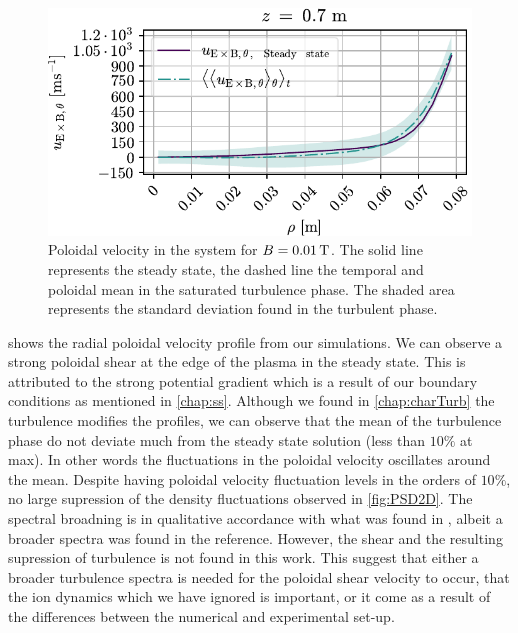 %
\begin{figure}[htbp]
    \centering
    \includegraphics{fig/results/poloidalFlow/poloidalFlow01}
    \caption{Poloidal velocity in the system for $B=0.01\, \text{T}$.
        The solid line represents the steady state, the dashed line the temporal and poloidal mean in the saturated turbulence phase.
        The shaded area represents the standard deviation found in the turbulent phase.}
    \label{fig:poloidalFlow0008}
\end{figure}
%
 shows the radial poloidal velocity profile from our simulations.
We can observe a strong poloidal shear at the edge of the plasma in the steady state.
This is attributed to the strong potential gradient which is a result of our boundary conditions as mentioned in \cref{chap:ss}.
Although we found in \cref{chap:charTurb} the turbulence modifies the profiles, we can observe that the mean of the turbulence phase do not deviate much from the steady state solution (less than $10\%$ at max).
In other words the fluctuations in the poloidal velocity oscillates around the mean.
Despite having poloidal velocity fluctuation levels in the orders of $10\%$, no large supression of the density fluctuations observed in \cref{fig:PSD2D}.
The spectral broadning is in qualitative accordance with what was found in \cite{Tynan2006a}, albeit a broader spectra was found in the reference.
However, the shear and the resulting supression of turbulence is not found in this work.
This suggest that either a broader turbulence spectra is needed for the poloidal shear velocity to occur, that the ion dynamics which we have ignored is important, or it come as a result of the differences between the numerical and experimental set-up.
%
